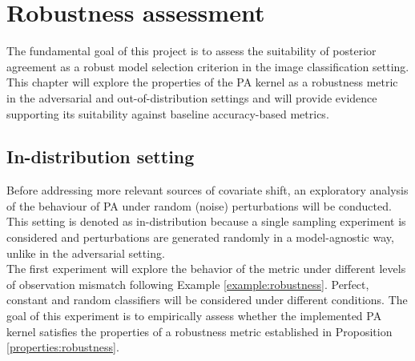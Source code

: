 \chapter{Robustness assessment}\label{chapter:robustness_assessment}

The fundamental goal of this project is to assess the suitability of posterior
agreement as a robust model selection criterion in the image classification setting.
This chapter will explore the properties of the PA kernel as a robustness metric in the
adversarial and out-of-distribution settings and will provide evidence supporting 
its suitability against baseline accuracy-based metrics.

\section{In-distribution setting}\label{sec:results_robustness}

Before addressing more relevant sources of covariate shift, an exploratory analysis
of the behaviour of PA under random (noise) perturbations will be conducted. This
setting is denoted as in-distribution because a single sampling experiment is 
considered and perturbations are generated randomly in a model-agnostic way,
unlike in the adversarial setting. \\

The first experiment will explore the behavior of the metric under different levels of 
observation mismatch following Example \ref{example:robustness}. Perfect, constant and random
classifiers will be considered under different conditions. The goal of this
experiment is to empirically assess whether the implemented PA kernel satisfies the 
properties of a robustness metric established in Proposition \ref{properties:robustness}.

